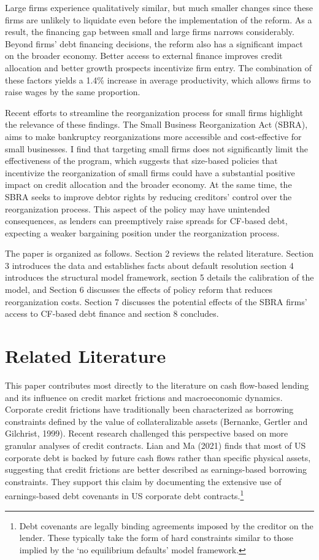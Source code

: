 \documentclass[12pt]{article}
\begin{document}
Large firms experience qualitatively similar, but much smaller changes since these firms are unlikely to liquidate even before the implementation of the reform. As a result, the financing gap between small and large firms narrows considerably. Beyond firms' debt financing decisions, the reform also has a significant impact on the broader economy. Better access to external finance improves credit allocation and better growth prospects incentivize firm entry. The combination of these factors yields a 1.4\% increase in average productivity, which allows firms to raise wages by the same proportion.

Recent efforts to streamline the reorganization process for small firms highlight the relevance of these findings. The Small Business Reorganization Act (SBRA), aims to make bankruptcy reorganizations more accessible and cost-effective for small businesses. I find that targeting small firms does not significantly limit the effectiveness of the program, which suggests that size-based policies that incentivize the reorganization of small firms could have a substantial positive impact on credit allocation and the broader economy. At the same time, the SBRA seeks to improve debtor rights by reducing creditors' control over the reorganization process. This aspect of the policy may have unintended consequences, as lenders can preemptively raise spreads for CF-based debt, expecting a weaker bargaining position under the reorganization process.

The paper is organized as follows. Section 2 reviews the related literature. Section 3 introduces the data and establishes facts about default resolution section 4 introduces the structural model framework, section 5 details the calibration of the model, and Section 6 discusses the effects of policy reform that reduces reorganization costs. Section 7 discusses the potential effects of the SBRA firms' access to CF-based debt finance and section 8 concludes.

\section{Related Literature \label{sec:literature}} 
This paper contributes most directly to the literature on cash flow-based lending and its influence on credit market frictions and macroeconomic dynamics. Corporate credit frictions have traditionally been characterized as borrowing constraints defined by the value of collateralizable assets (Bernanke, Gertler and Gilchrist, 1999). Recent research challenged this perspective based on more granular analyses of credit contracts. Lian and Ma (2021) finds that most of US corporate debt is backed by future cash flows rather than specific physical assets, suggesting that credit frictions are better described as earnings-based borrowing constraints. They support this claim by documenting the extensive use of earnings-based debt covenants in US corporate debt contracts.\footnote{Debt covenants are legally binding agreements imposed by the creditor on the lender. These typically take the form of hard constraints similar to those implied by the `no equilibrium defaults' model framework.} 
\end{document}
